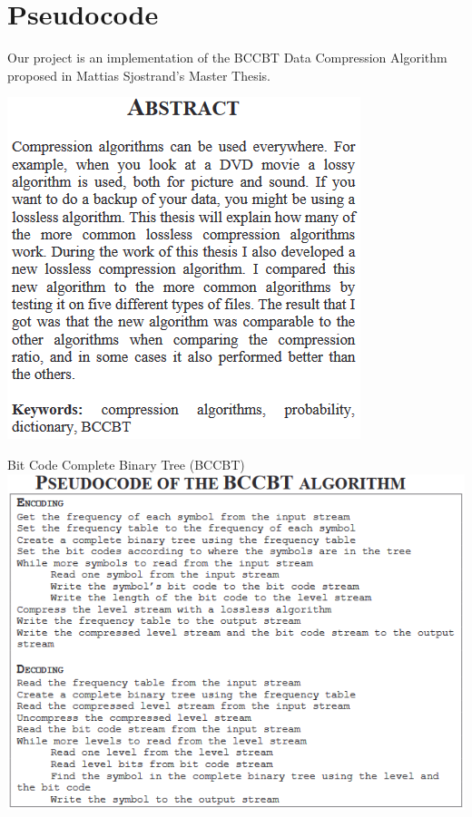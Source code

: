 \documentclass{beamer}
\begin{document}
\section{Pseudocode}
\begin{frame}
Our project is an implementation of the BCCBT Data Compression Algorithm proposed in 
Mattias Sjostrand's Master Thesis.
\begin{center}
\includegraphics[scale=0.55]{abstract}
\end{center}

\end{frame}

\begin{frame}
\begin{center}
Bit Code Complete Binary Tree (BCCBT)
\includegraphics[scale=0.55]{pseudocode}
\end{center}
\end{frame}
\end{document}
